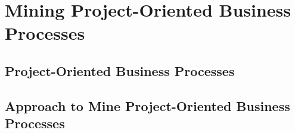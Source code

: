 \chapter{Mining Project-Oriented Business Processes}


%
%



\section{Project-Oriented Business Processes}



\section{Approach to Mine Project-Oriented Business Processes}







